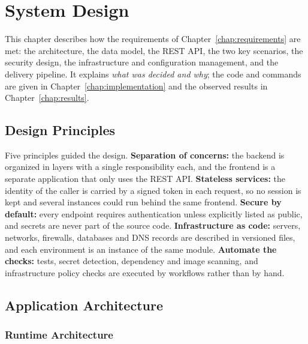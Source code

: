 
\chapter{System Design}\label{chap:design}

This chapter describes how the requirements of Chapter~\ref{chap:requirements} are met: the architecture, the data model, the REST API, the two key scenarios, the security design, the infrastructure and configuration management, and the delivery pipeline. It explains \emph{what was decided and why}; the code and commands are given in Chapter~\ref{chap:implementation} and the observed results in Chapter~\ref{chap:results}.

\section{Design Principles}

Five principles guided the design. \textbf{Separation of concerns:} the backend is organized in layers with a single responsibility each, and the frontend is a separate application that only uses the REST API. \textbf{Stateless services:} the identity of the caller is carried by a signed token in each request, so no session is kept and several instances could run behind the same frontend. \textbf{Secure by default:} every endpoint requires authentication unless explicitly listed as public, and secrets are never part of the source code. \textbf{Infrastructure as code:} servers, networks, firewalls, databases and DNS records are described in versioned files, and each environment is an instance of the same module. \textbf{Automate the checks:} tests, secret detection, dependency and image scanning, and infrastructure policy checks are executed by workflows rather than by hand.

\section{Application Architecture}

\subsection{Runtime Architecture}

